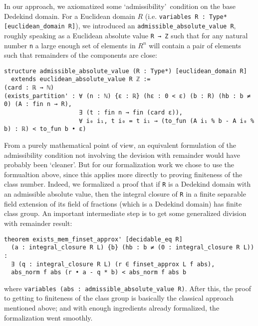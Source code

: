 \documentclass[a4paper,USenglish,cleveref, autoref, thm-restate]{lipics-v2021}
\newcommand{\lean}[1]{\texttt{#1}\xspace} %
\begin{document}
In our approach, we axiomatized some \lq admissibility\rq\ condition on the base Dedekind domain.
For a Euclidean domain $R$ (i.e. \lean{variables {R : Type*} [euclidean\_domain R]}),
we introduced an \lean{admissible\_absolute\_value R},
roughly speaking as a Euclidean absolute value  \lean{R → Z}
such that for any natural number \lean{n} a large enough set of elements in $R^n$ will contain a pair of elements such that remainders of the components are close: 
\begin{lstlisting}
structure admissible_absolute_value (R : Type*) [euclidean_domain R]
  extends euclidean_absolute_value R ℤ :=
(card : ℝ → ℕ)
(exists_partition' : ∀ (n : ℕ) {ε : ℝ} (hε : 0 < ε) (b : R) (hb : b ≠ 0) (A : fin n → R),
                     ∃ (t : fin n → fin (card ε)),
                     ∀ i₀ i₁, t i₀ = t i₁ → (to_fun (A i₁ % b - A i₀ % b) : ℝ) < to_fun b • ε)
\end{lstlisting}
From a purely mathematical point of view, an equivalent formulation of the admissibility condition not involving the devision with remainder would have probably been \lq cleaner\rq. But for our formalization work we chose to use the formualtion above, since this applies more directly to proving finiteness of the class number. Indeed, we formalized a proof that if \lean{R} is a Dedekind domain with an admissible absolute value, then the integral closure of \lean{R} in a finite separable field extension of its field of fractions (which is a Dedekind domain) has finite class group. An important intermediate step is to get some generalized division with remainder result:


\begin{lstlisting}
theorem exists_mem_finset_approx' [decidable_eq R]
  (a : integral_closure R L) {b} (hb : b ≠ (0 : integral_closure R L)) :
  ∃ (q : integral_closure R L) (r ∈ finset_approx L f abs),
  abs_norm f abs (r • a - q * b) < abs_norm f abs b
\end{lstlisting}
where \lean{variables (abs : admissible\_absolute\_value R)}.
After this, the proof to getting to finiteness of the class group is basically the classical approach mentioned above; and with enough ingredients already formalized, the formalization went smoothly.
\end{document}
